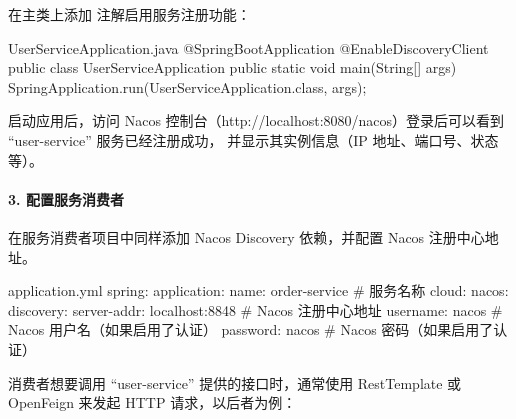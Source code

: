 在主类上添加  注解启用服务注册功能：
\begin{codeblock}[java]{UserServiceApplication.java}
@SpringBootApplication
@EnableDiscoveryClient
public class UserServiceApplication {
    public static void main(String[] args) {
        SpringApplication.run(UserServiceApplication.class, args);
    }
}
\end{codeblock}


启动应用后，访问 Nacos 控制台（http://localhost:8080/nacos）登录后可以看到 ``user-service'' 服务已经注册成功，
并显示其实例信息（IP 地址、端口号、状态等）。

\paragraph{3. 配置服务消费者}
在服务消费者项目中同样添加 Nacos Discovery 依赖，并配置 Nacos 注册中心地址。
\begin{codeblock}[yml]{application.yml}
spring:
    application:
    name: order-service # 服务名称
    cloud:
        nacos:
            discovery:
                server-addr: localhost:8848 # Nacos 注册中心地址
                username: nacos # Nacos 用户名（如果启用了认证）
                password: nacos # Nacos 密码（如果启用了认证）
    
\end{codeblock}
消费者想要调用 ``user-service'' 提供的接口时，通常使用 RestTemplate 或 OpenFeign 来发起 HTTP 请求，以后者为例：


